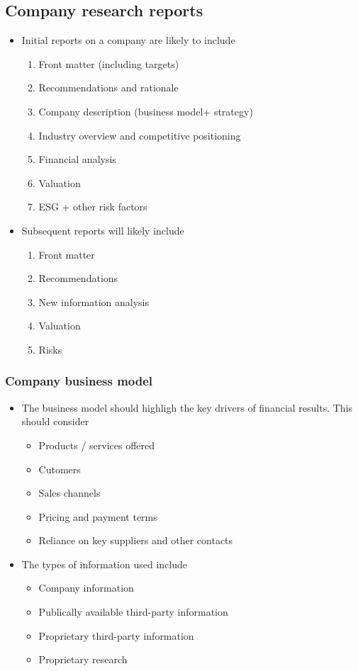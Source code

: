 \documentclass[../notes_compiled.tex]{subfiles}
\begin{document}
\subsection{Company research reports}
\begin{itemize}
\item Initial reports on a company are likely to include
\begin{enumerate}
\item Front matter (including targets)
\item Recommendations and rationale
\item Company description (business model+ strategy)
\item Industry overview and competitive positioning
\item Financial analysis
\item Valuation
\item ESG + other risk factors
\end{enumerate}
\item Subsequent reports will likely include
\begin{enumerate}
\item Front matter
\item Recommendations
\item New information analysis
\item Valuation
\item Risks
\end{enumerate}
\end{itemize}

\subsubsection{Company business model}
\begin{itemize}
\item The business model should highligh the key drivers of financial results. This should consider
\begin{itemize}
\item Products / services offered
\item Cutomers
\item Sales channels
\item Pricing and payment terms
\item Reliance on key suppliers and other contacts
\end{itemize}
\item The types of information used include
\begin{itemize}
\item Company information
\item Publically available third-party information
\item Proprietary third-party information
\item Proprietary research
\end{itemize}
\end{itemize}
\end{document}

